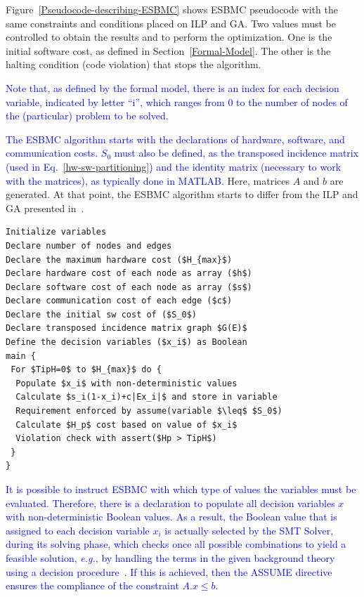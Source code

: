 \documentclass{doublecol-new}
\theoremstyle{TH}{
\newtheorem{lemma}{Lemma}
\newtheorem{theorem}[lemma]{Theorem}
\newtheorem{corrolary}[lemma]{Corrolary}
\newtheorem{conjecture}[lemma]{Conjecture}
\newtheorem{proposition}[lemma]{Proposition}
\newtheorem{claim}[lemma]{Claim}
\newtheorem{stheorem}[lemma]{Wrong Theorem}
\newtheorem{algorithm}{Algorithm}
}
\theoremstyle{THrm}{
\newtheorem{definition}{Definition}[section]
\newtheorem{question}{Question}[section]
\newtheorem{remark}{Remark}
\newtheorem{scheme}{Scheme}
}
\theoremstyle{THhit}{
\newtheorem{case}{Case}[section]
}
\begin{document}
Figure~\ref{Pseudocode-describing-ESBMC} shows ESBMC pseudocode with the same constraints and conditions placed on ILP and GA. Two values must be controlled to obtain the results and to perform the optimization. One is the initial software cost, as defined in Section~\ref{Formal-Model}. The other is the halting condition (code violation) that stops the algorithm.

\textcolor{blue}{Note that, as defined by the formal model, there is an index for each decision variable, indicated by letter ``i'', which ranges from $0$ to the number of nodes of the (particular) problem to be solved.} 


\textcolor{blue}{The ESBMC algorithm starts with the declarations of hardware, software, and communication costs. $S_0$ must also be defined, as the transposed incidence matrix (used in Eq.~\eqref{hw-sw-partitioning}) and the identity matrix (necessary to work with the matrices), as typically done in MATLAB.} Here, matrices $A$ and $b$ are generated. At that point, the ESBMC algorithm starts to differ from the ILP and GA presented in~\cite{Trindade2015}.

\begin{lstlisting}[basicstyle=\footnotesize,caption={Pseudocode describing sequential ESBMC.},label={Pseudocode-describing-ESBMC},numbersep=7pt,frame=tb,captionpos=t,numberstyle=\tiny,mathescape=true]
Initialize variables 
Declare number of nodes and edges
Declare the maximum hardware cost ($H_{max}$)
Declare hardware cost of each node as array ($h$)
Declare software cost of each node as array ($s$)
Declare communication cost of each edge ($c$)
Declare the initial sw cost of ($S_0$)
Declare transposed incidence matrix graph $G(E)$
Define the decision variables ($x_i$) as Boolean
main {
 For $TipH=0$ to $H_{max}$ do {
  Populate $x_i$ with non-deterministic values
  Calculate $s_i(1-x_i)+c|Ex_i|$ and store in variable
  Requirement enforced by assume(variable $\leq$ $S_0$)
  Calculate $H_p$ cost based on value of $x_i$
  Violation check with assert($Hp > TipH$)
 }
}
\end{lstlisting}

\vspace{2 mm}
\textcolor{blue}{It is possible to instruct ESBMC with which type of values the variables must be evaluated. Therefore, there is a declaration to populate all decision variables $x$ with non-deterministic Boolean values. As a result, the Boolean value that is assigned to each decision variable $x_i$ is actually selected by the SMT Solver, during its solving phase, which checks once all possible combinations to yield a feasible solution, {\it e.g.}, by handling the terms in the given background theory using a decision procedure~\cite{DeMoura2008,Brummayer2009}. If this is achieved, then the ASSUME directive ensures the compliance of the constraint $A.x \leq b$}.
\end{document}

